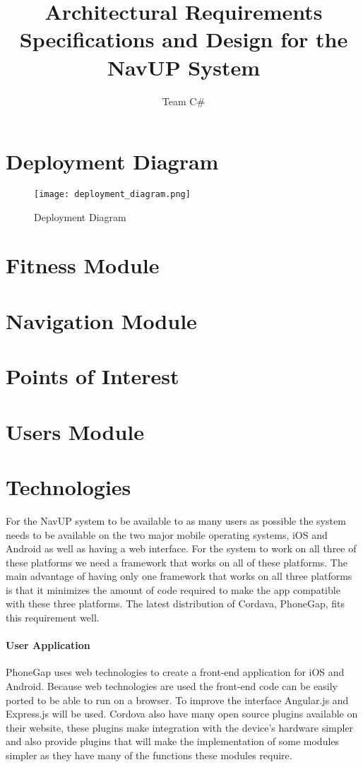 \documentclass[11pt]{article}
\author{Team C\#}
\title{Architectural Requirements Specifications and Design for the NavUP System}
\begin{document}
	\setlength{\parskip}{6pt}
	
	
	
	\tableofcontents
	
	\newpage
	
\section{Deployment Diagram}
\begin{figure}[H]
	\centering
	\texttt{[image: deployment\_diagram.png]}
	\caption{Deployment Diagram}
	\label{fig:deployment_diagram}
\end{figure}

\section{Fitness Module}
    
    
\section{Navigation Module}
    

\section{Points of Interest}
    
    
\section{Users Module}
    
    
\section{Technologies}
For the NavUP system to be available to as many users as possible the system needs to be available on the two major mobile operating systems, iOS and Android as well as having a web interface. For the system to work on all three of these platforms we need a framework that works on all of these platforms. The main advantage of having only one framework that works on all three platforms is that it minimizes the amount of code required to make the app compatible with these three platforms. The latest distribution of Cordava, PhoneGap, fits this requirement well.

\paragraph{User Application}
PhoneGap uses web technologies to create a front-end application for iOS and Android. Because web technologies are used the front-end code can be easily ported to be able to run on a browser. To improve the interface Angular.js and Express.js will be used. Cordova also have many open source plugins available on their website, these plugins make integration with the device's hardware simpler and also provide plugins that will make the implementation of some modules simpler as they have many of the functions these modules require.
\end{document}
